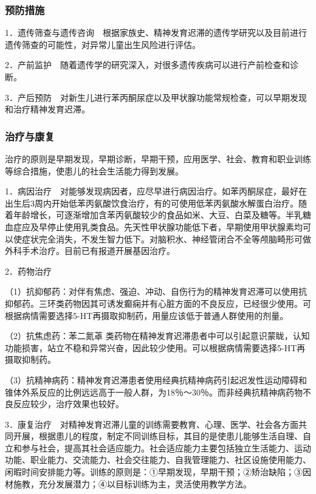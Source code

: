 \subsubsection{预防措施}

1．遗传筛查与遗传咨询　根据家族史、精神发育迟滞的遗传学研究以及目前进行遗传筛查的可能性，对异常儿童出生风险进行评估。

2．产前监护　随着遗传学的研究深入，对很多遗传疾病可以进行产前检查和诊断。

3．产后预防　对新生儿进行苯丙酮尿症以及甲状腺功能常规检查，可以早期发现和治疗精神发育迟滞。

\subsubsection{治疗与康复}

治疗的原则是早期发现，早期诊断，早期干预，应用医学、社会、教育和职业训练等综合措施，使患儿的社会生活能力得到发展。

1．病因治疗　对能够发现病因者，应尽早进行病因治疗。如苯丙酮尿症，最好在出生后3周内开始低苯丙氨酸饮食治疗，有的可使用低苯丙氨酸水解蛋白治疗。随着年龄增长，可逐渐增加含苯丙氨酸较少的食品如米、大豆、白菜及糖等。半乳糖血症应及早停止使用乳类食品。先天性甲状腺功能低下者，早期使用甲状腺素均可以使症状完全消失，不发生智力低下。对脑积水、神经管闭合不全等颅脑畸形可做外科手术治疗。目前已有报道开展基因治疗。

2．药物治疗

（1）抗抑郁药：对伴有焦虑、强迫、冲动、自伤行为的精神发育迟滞可以使用抗抑郁药。三环类药物因其可诱发癫痫并有心脏方面的不良反应，已经很少使用。可根据病情需要选择5-HT再摄取抑制药，用量应该低于普通人群使用的剂量。

（2）抗焦虑药：苯二氮䓬
类药物在精神发育迟滞患者中可以引起意识蒙眬，认知功能损害，站立不稳和异常兴奋，因此较少使用。可以根据病情需要选择5-HT再摄取抑制药。

（3）抗精神病药：精神发育迟滞患者使用经典抗精神病药引起迟发性运动障碍和锥体外系反应的比例远远高于一般人群，为18％～30％。而非经典抗精神病药物不良反应较少，治疗效果也较好。

3．康复治疗　对精神发育迟滞儿童的训练需要教育、心理、医学、社会各方面共同开展，根据患儿的程度，制定不同训练目标，其目的是使患儿能够生活自理、自立和参与社会，提高其社会适应能力。社会适应能力主要包括独立生活能力、运动功能、职业能力、交流能力、社会交往能力、自我管理能力、社区设施使用能力、闲暇时间安排能力等。训练的原则是：①早期发现，早期干预；②矫治缺陷；③因材施教，充分发展潜力；④以目标训练为主，灵活使用教学方法。

